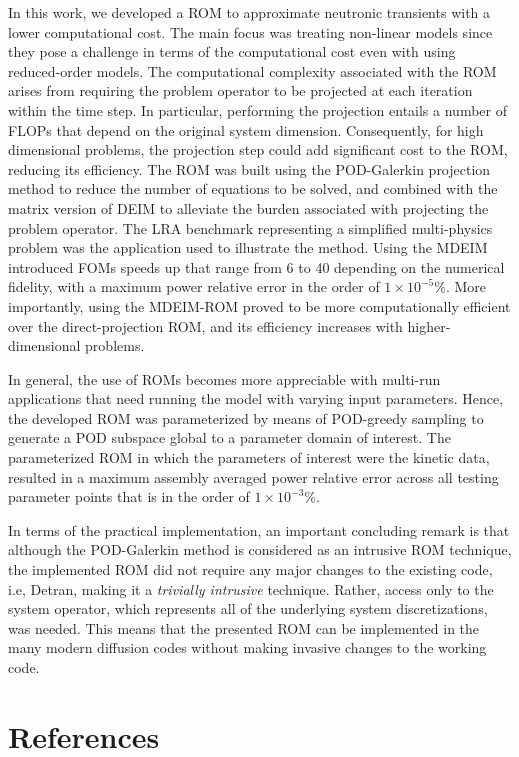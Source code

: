 \documentclass[review,number,sort&compress,12pt]{elsarticle}
\begin{document}
In this work, we developed a ROM to approximate neutronic transients with a lower computational cost.
The main focus was treating non-linear models since they pose a challenge in terms of the computational cost even with using reduced-order models.
The computational complexity associated with the ROM arises from requiring the problem operator to be projected at each iteration within the time step.
In particular, performing the projection entails a number of FLOPs that depend on the original system dimension.
Consequently, for high dimensional problems, the projection step could add significant cost to the ROM, reducing its efficiency.
The ROM was built using the POD-Galerkin projection method to reduce the number of equations to be solved, and combined with the matrix version of DEIM to alleviate the burden associated with projecting the problem operator.
The LRA benchmark representing a simplified multi-physics problem was the application used to illustrate the method.
Using the MDEIM introduced FOMs speeds up that range from 6 to 40 depending on the numerical fidelity, with a maximum power relative error in the order of $1\times 10^{-5}$\%.
More importantly, using the MDEIM-ROM proved to be more computationally efficient over the direct-projection ROM, and its efficiency increases with higher-dimensional problems.

In general, the use of ROMs becomes more appreciable with multi-run applications that need running the model with varying input parameters.
Hence, the developed ROM was parameterized by means of POD-greedy sampling to generate a POD subspace global to a parameter domain of interest.
The parameterized ROM in which the parameters of interest were the kinetic data, resulted in a maximum assembly averaged power relative error across all testing parameter points that is in the order of $1\times 10^{-3}$\%.

In terms of the practical implementation, an important concluding remark is that although the POD-Galerkin method is considered as an intrusive ROM technique, the implemented ROM did not require any major changes to the existing code, i.e, Detran,  making it a {\it trivially intrusive} technique.
Rather, access only to the system operator, which represents all of the underlying system discretizations, was needed.
This means that the presented ROM can be implemented in the many modern diffusion codes without making invasive changes to the working code.


\section*{References}



\end{document}
